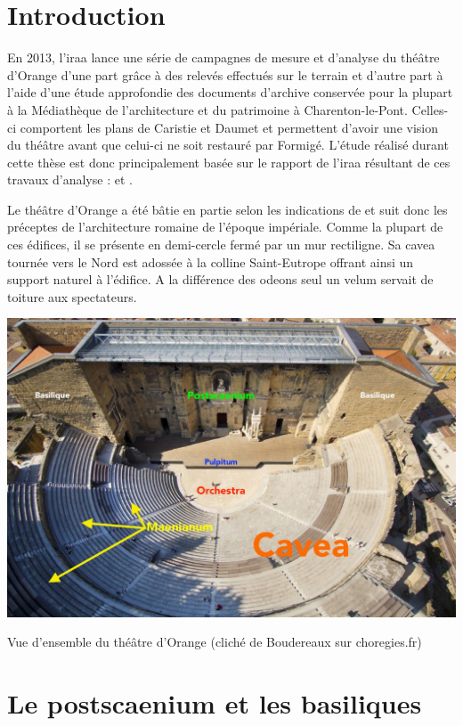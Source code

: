 		\section{Introduction}
		
		En 2013, l'\gls{iraa} lance une série de campagnes de mesure et d'analyse du théâtre d'Orange d'une part grâce à des relevés effectués sur le terrain et d'autre part à l'aide d'une étude approfondie des documents d'archive conservée pour la plupart à la Médiathèque de l'architecture et du patrimoine à Charenton-le-Pont. Celles-ci comportent les plans de Caristie et Daumet et permettent d'avoir une vision du théâtre avant que celui-ci ne soit restauré par Formigé. L'étude réalisé durant cette thèse est donc principalement basée sur le rapport de l'\gls{iraa} résultant de ces travaux d'analyse : \cite{orangeTxt} et \citep{orangePl}.
		
		Le théâtre d'Orange a été bâtie en partie selon les indications de \cite{vitruve} et suit donc les préceptes de l'architecture romaine de l'époque impériale. Comme la plupart de ces édifices, il se présente en demi-cercle fermé par un mur rectiligne. Sa \gls{cavea} tournée vers le Nord est adossée à la colline Saint-Eutrope offrant ainsi un support naturel à l'édifice. A la différence des \glspl{odeon} seul un \gls{velum} servait de toiture aux spectateurs.

\begin{figureth}
		\includegraphics[width=\linewidth]{images/vuensemble}
		\caption[Vue d'ensemble du théâtre d'Orange]{Vue d'ensemble du théâtre d'Orange (cliché de Boudereaux sur choregies.fr)}
\end{figureth}


		\section{Le \gls{postscaenium} et les \glspl{basilique} }
		
